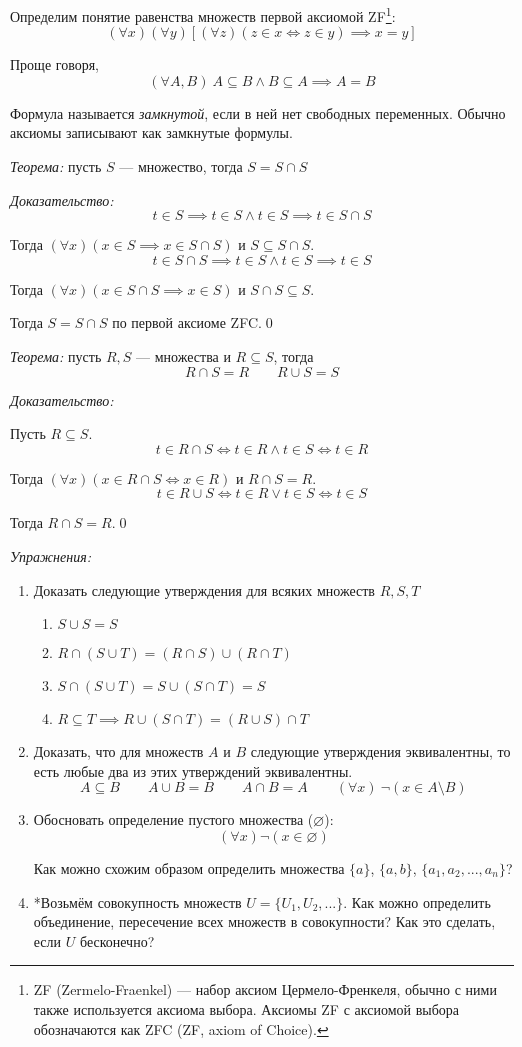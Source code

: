 Определим понятие равенства множеств первой аксиомой ZF\footnote{
	ZF (Zermelo-Fraenkel) --- набор аксиом Цермело-Френкеля, обычно с ними также
	используется аксиома выбора. Аксиомы ZF с аксиомой выбора
	обозначаются как ZFC (ZF, axiom of Choice).
}:
\[
	(\forall x)(\forall y)[(\forall z)(z\in x\iff z\in y)\implies x=y]
\]

Проще говоря,
\[
	(\forall A,B)	~A\subseteq B\land B\subseteq A\implies A=B
\]

Формула называется {\it замкнутой}, если в ней нет свободных переменных. Обычно
аксиомы записывают как замкнутые формулы.

{\it Теорема:} пусть $S$ --- множество, тогда $S=S\cap S$

{\it Доказательство:}
\[
	t\in S\implies t\in S\land t\in S\implies t\in S\cap S
\]

Тогда $(\forall x)(x\in S\implies x\in S\cap S)$ и $S\subseteq S\cap S$.
\[
	t\in S\cap S\implies t\in S\land t\in S\implies t\in S
\]

Тогда $(\forall x)(x\in S\cap S\implies x\in S)$ и $S\cap S\subseteq S$.

Тогда $S=S\cap S$ по первой аксиоме ZFC.\qed

{\it Теорема:} пусть $R,S$ --- множества и $R\subseteq S$, тогда
\[
	R\cap S= R\qquad R\cup S= S
\]

{\it Доказательство:}

Пусть $R\subseteq S$.
\[
	t\in R\cap S\iff t\in R\land t\in S\iff t\in R
\]

Тогда $(\forall x)(x\in R\cap S\iff x\in R)$ и $R\cap S=R$.
\[
	t\in R\cup S\iff t\in R\lor t\in S\iff t\in S
\]

Тогда $R\cap S=R$.\qed

{\it Упражнения:}
\begin{enumerate}
	\item{}Доказать следующие утверждения для всяких множеств $R,S,T$
	\begin{enumerate}
		\item{}$S\cup S=S$
		\item{}$R\cap (S\cup T)=(R\cap S)\cup (R\cap T)$
		\item{}$S\cap (S\cup T)=S\cup (S\cap T)=S$
		\item{}$R\subseteq T\implies R\cup (S\cap T)=(R\cup S)\cap T$
	\end{enumerate}

	\item{}Доказать, что для множеств $A$ и $B$ следующие утверждения эквивалентны,
	то есть любые два из этих утверждений эквивалентны.
	\[
		A\subseteq B\qquad A\cup B=B\qquad A\cap B=A
		\qquad (\forall x)~\lnot(x\in A\setminus B)
	\]
	\item{}Обосновать определение пустого множества ($\varnothing$):
	\[
		(\forall x)\lnot(x\in \varnothing)
	\]

	Как можно схожим образом определить множества $\{a\}$, $\{a,b\}$,
	$\{a_1,a_2,...,a_{n}\}$?
	\item{}*Возьмём совокупность множеств $U=\{U_{1},U_{2},...\}$.
	Как можно определить объединение, пересечение всех множеств в совокупности?
	Как это сделать, если $U$ бесконечно?
\end{enumerate}

